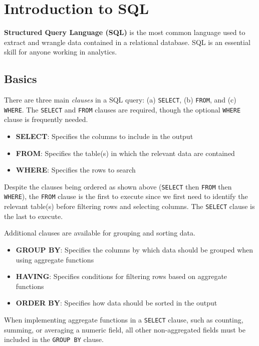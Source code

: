 \documentclass[
]{book}
\providecommand{\tightlist}{%
  \setlength{\itemsep}{0pt}\setlength{\parskip}{0pt}}
\begin{document}
\hypertarget{sql-intro}{%
\chapter{Introduction to SQL}\label{sql-intro}}

\textbf{Structured Query Language (SQL)} is the most common language used to extract and wrangle data contained in a relational database. SQL is an essential skill for anyone working in analytics.

\hypertarget{basics}{%
\section{Basics}\label{basics}}

There are three main \emph{clauses} in a SQL query: (a) \texttt{SELECT}, (b) \texttt{FROM}, and (c) \texttt{WHERE}. The \texttt{SELECT} and \texttt{FROM} clauses are required, though the optional \texttt{WHERE} clause is frequently needed.

\begin{itemize}
\tightlist
\item
  \textbf{SELECT}: Specifies the columns to include in the output
\item
  \textbf{FROM}: Specifies the table(s) in which the relevant data are contained
\item
  \textbf{WHERE}: Specifies the rows to search
\end{itemize}

Despite the clauses being ordered as shown above (\texttt{SELECT} then \texttt{FROM} then \texttt{WHERE}), the \texttt{FROM} clause is the first to execute since we first need to identify the relevant table(s) before filtering rows and selecting columns. The \texttt{SELECT} clause is the last to execute.

Additional clauses are available for grouping and sorting data.

\begin{itemize}
\tightlist
\item
  \textbf{GROUP BY}: Specifies the columns by which data should be grouped when using aggregate functions
\item
  \textbf{HAVING}: Specifies conditions for filtering rows based on aggregate functions
\item
  \textbf{ORDER BY}: Specifies how data should be sorted in the output
\end{itemize}

When implementing aggregate functions in a \texttt{SELECT} clause, such as counting, summing, or averaging a numeric field, all other non-aggregated fields must be included in the \texttt{GROUP\ BY} clause.
\end{document}
